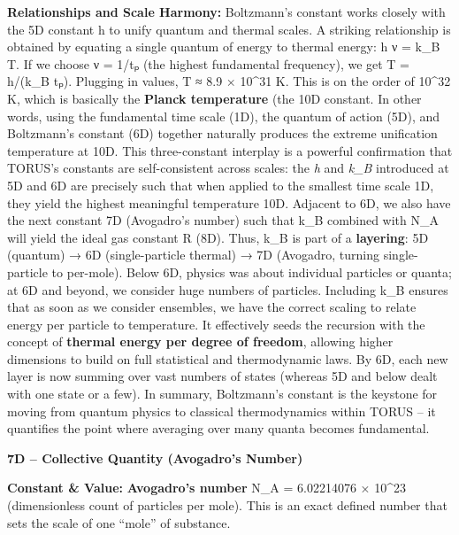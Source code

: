 \documentclass[]{article}
\begin{document}
\textbf{Relationships and Scale Harmony:} Boltzmann's constant works
closely with the 5D constant h to unify quantum and thermal scales. A
striking relationship is obtained by equating a single quantum of energy
to thermal energy: h ν = k\_B T. If we choose ν = 1/tₚ (the highest
fundamental frequency), we get T = h/(k\_B tₚ). Plugging in values, T ≈
8.9 × 10\^{}31 K​. This is on the order of 10\^{}32 K, which is
basically the \textbf{Planck temperature} (the 10D constant. In other
words, using the fundamental time scale (1D), the quantum of action
(5D), and Boltzmann's constant (6D) together naturally produces the
extreme unification temperature at 10D. This three-constant interplay is
a powerful confirmation that TORUS's constants are self-consistent
across scales: the \emph{h} and \emph{k\_B} introduced at 5D and 6D are
precisely such that when applied to the smallest time scale 1D, they
yield the highest meaningful temperature 10D​. Adjacent to 6D, we also
have the next constant 7D (Avogadro's number) such that k\_B combined
with N\_A will yield the ideal gas constant R (8D)​. Thus, k\_B is part
of a \textbf{layering}: 5D (quantum) → 6D (single-particle thermal) → 7D
(Avogadro, turning single-particle to per-mole). Below 6D, physics was
about individual particles or quanta; at 6D and beyond, we consider huge
numbers of particles. Including k\_B ensures that as soon as we consider
ensembles, we have the correct scaling to relate energy per particle to
temperature. It effectively seeds the recursion with the concept of
\textbf{thermal energy per degree of freedom}, allowing higher
dimensions to build on full statistical and thermodynamic laws. By 6D,
each new layer is now summing over vast numbers of states (whereas 5D
and below dealt with one state or a few). In summary, Boltzmann's
constant is the keystone for moving from quantum physics to classical
thermodynamics within TORUS -- it quantifies the point where averaging
over many quanta becomes fundamental.

\textbf{7D -- Collective Quantity (Avogadro's Number)}

\textbf{Constant \& Value:} \textbf{Avogadro's number} N\_A = 6.02214076
× 10\^{}23 (dimensionless count of particles per mole)​. This is an
exact defined number that sets the scale of one ``mole'' of substance.
\end{document}
